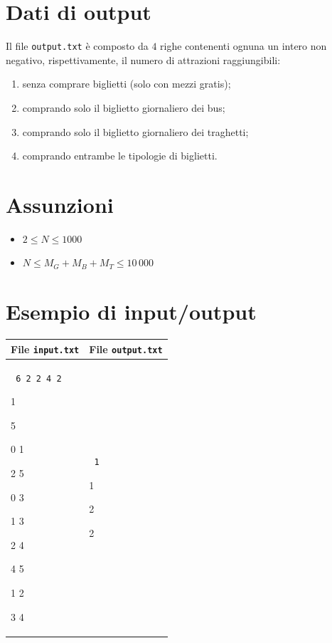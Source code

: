 \documentclass[a4paper,11pt]{article}
\newcommand{\file}[1]{\texttt{#1}}
\newcommand{\esempio}[2]{
\noindent\begin{minipage}{\textwidth}
\begin{tabular}{|p{11cm}|p{5cm}|}
	\hline
	\textbf{File \file{input.txt}} & \textbf{File \file{output.txt}}\\
	\hline
	\tt \small #1 &
	\tt \small #2 \\
	\hline
\end{tabular}
\end{minipage}
}
\begin{document}
\section*{Dati di output}
Il file \verb'output.txt' è composto da $4$ righe contenenti ognuna un
intero non negativo, rispettivamente, il numero di attrazioni
raggiungibili:
\begin{enumerate}
  \item senza comprare biglietti (solo con mezzi gratis);
  \item comprando solo il biglietto giornaliero dei bus;
  \item comprando solo il biglietto giornaliero dei traghetti;
  \item comprando entrambe le tipologie di biglietti.
\end{enumerate}

\section*{Assunzioni}
\begin{itemize}[nolistsep, noitemsep]
  \item $2 \le N \le 1000$
  \item $N \le M_G+M_B+M_T \le 10\,000$
\end{itemize}

\section*{Esempio di input/output}
\esempio{
6 2 2 4 2

1

5

0 1

2 5

0 3

1 3

2 4

4 5

1 2

3 4
}{
1

1

2

2
}
\end{document}
